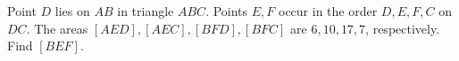 Point $D$ lies on $AB$ in triangle $ABC$. Points $E,F$ occur in the order $D,E,F,C$ on $DC$. The areas $[AED],[AEC],[BFD],[BFC]$ are $6,10,17,7$, respectively. Find $[BEF]$.
